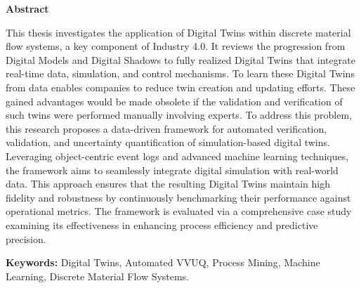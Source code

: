 \thispagestyle{plain} %

\vspace*{1.5in} %

\begin{center}
  {\Large \textbf{Abstract}}
\end{center}

This thesis investigates the application of Digital Twins within discrete material flow systems, a key component of Industry 4.0. It reviews the progression from Digital Models and Digital Shadows to fully realized Digital Twins that integrate real-time data, simulation, and control mechanisms. To learn these Digital Twins from data enables companies to reduce twin creation and updating efforts. These gained advantages would be made obsolete if the validation and verification of such twins were performed manually involving experts. To address this problem, this research proposes a data-driven framework for automated verification, validation, and uncertainty quantification of simulation-based digital twins. Leveraging object-centric event logs and advanced machine learning techniques, the framework aims to seamlessly integrate digital simulation with real-world data. This approach ensures that the resulting Digital Twins maintain high fidelity and robustness by continuously benchmarking their performance against operational metrics. The framework is evaluated via a comprehensive case study examining its effectiveness in enhancing process efficiency and predictive precision.

\medskip

\textbf{Keywords:} Digital Twins, Automated VVUQ, Process Mining, Machine Learning, Discrete Material Flow Systems.

\clearpage